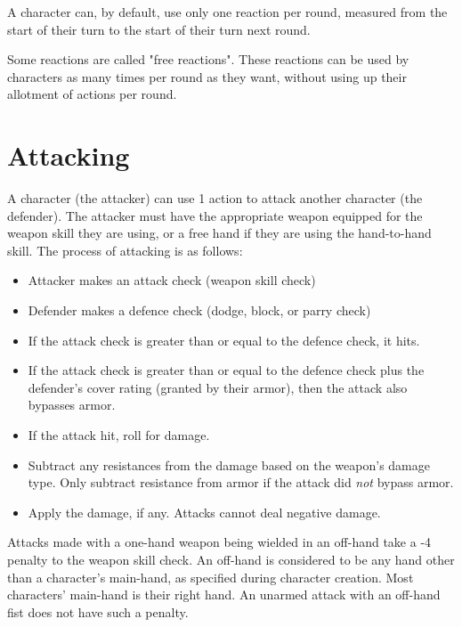 \begin{multicols*}{2}
    A character can, by default, use only one reaction per round, measured
    from the start of their turn to the start of their turn next round.

    Some reactions are called "free reactions". These
    reactions can be used by characters as many times per round as they want,
    without using up their allotment of actions per round.

    \section{Attacking}\label{combat:attacking}
    A character (the attacker) can use 1 action to attack another character
    (the defender). The attacker must have the appropriate weapon equipped
    for the weapon skill they are using, or a free hand if they are using
    the hand-to-hand skill. The process of attacking is as follows:
    \begin{itemize}
        \item Attacker makes an attack check (weapon skill check)
        \item Defender makes a defence check (dodge, block, or parry check)
        \item If the attack check is greater than or equal to the defence
            check, it hits.
        \item If the attack check is greater than or equal to the defence check
            plus the defender's cover rating (granted by
            their armor), then the attack also bypasses armor.
        \item If the attack hit, roll for damage.
        \item Subtract any resistances from the damage based
            on the weapon's damage type. Only subtract resistance from armor
            if the attack did \textit{not} bypass armor.
        \item Apply the damage, if any. Attacks cannot deal negative damage.
    \end{itemize}

    Attacks made with a one-hand weapon being wielded in an off-hand take a -4
    penalty to the weapon skill check. An off-hand is considered to be any hand
    other than a character's main-hand, as specified during character creation.
    Most characters' main-hand is their right hand. An unarmed attack with an
    off-hand fist does not have such a penalty.


\end{multicols*}
